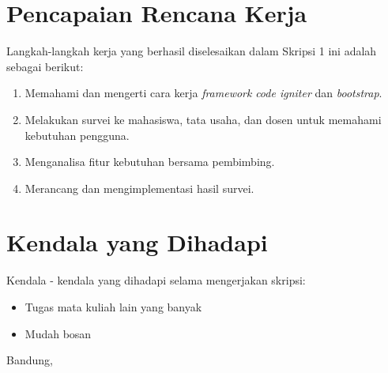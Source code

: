 \documentclass[a4paper,twoside]{article}
\begin{document}
\section{Pencapaian Rencana Kerja}
Langkah-langkah kerja yang berhasil diselesaikan dalam Skripsi 1 ini adalah sebagai berikut:
\begin{enumerate}
\item Memahami dan mengerti cara kerja \textit{framework} \textit{code igniter} dan \textit{bootstrap}.

\item Melakukan survei ke mahasiswa, tata usaha, dan dosen untuk memahami kebutuhan pengguna.

\item Menganalisa fitur kebutuhan bersama pembimbing.

\item Merancang dan mengimplementasi hasil survei.

\end{enumerate}



\section{Kendala yang Dihadapi}

Kendala - kendala yang dihadapi selama mengerjakan skripsi:
\begin{itemize}
	\item Tugas mata kuliah lain yang banyak
	\item Mudah bosan
\end{itemize}

\newpage
\vspace{1cm}
\centering Bandung, \tanggal\\
\vspace{2cm} \nama \\ 
\vspace{1cm}
\end{document}
